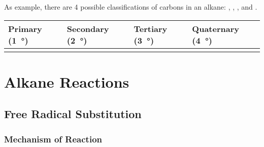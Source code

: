 		As example, there are 4 possible classifications of carbons in an alkane: , , ,
		and .

		\begin{table}[ht]\renewcommand{\arraystretch}{1.4}\begin{center}
		\begin{tabu} to 0.9\textwidth { X[c,m] | X[c,m] | X[c,m] | X[c,m] }

			Primary (\SI{1}{\degree})		&
			Secondary (\SI{2}{\degree})		&
			Tertiary (\SI{3}{\degree})		&
			Quaternary (\SI{4}{\degree})	\\

			\hline

			\vspace{2mm}								\vspace{2mm}	&
			\vspace{2mm}						\vspace{2mm}	&
			\vspace{2mm}				\vspace{2mm}	&
			\vspace{2mm}		\vspace{2mm}	\\

		\end{tabu}\end{center}
		\end{table}\vspace{-1em}




	\pagebreak
	\section{Alkane Reactions}
		\subsection{Free Radical Substitution}

			\subsubsection{Mechanism of Reaction}

